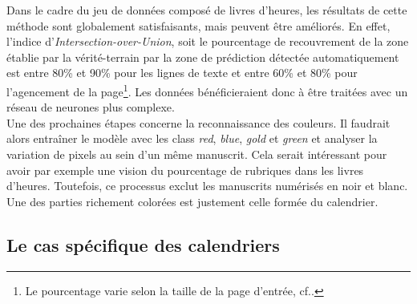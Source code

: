 \documentclass[a4paper,12pt,twoside]{book}
\begin{document}
    Dans le cadre du jeu de données composé de livres d'heures, les résultats de cette méthode sont globalement satisfaisants, mais peuvent être améliorés. En effet, l'indice d'\textit{Intersection-over-Union}, soit le pourcentage de recouvrement de la zone établie par la vérité-terrain par la zone de prédiction détectée automatiquement est entre 80\% et 90\% pour les lignes de texte et entre 60\% et 80\% pour l'agencement de la page\footnote{Le pourcentage varie selon la taille de la page d'entrée, cf.\cite[p. 10]{annotated_dataset_book_hours}.}. Les données bénéficieraient donc à être traitées avec un réseau de neurones plus complexe. \\
    
    Une des prochaines étapes concerne la reconnaissance des couleurs. Il faudrait alors entraîner le modèle avec les class \og \textit{red}\fg{}, \og \textit{blue}\fg{}, \og \textit{gold}\fg{} et \og \textit{green}\fg{} et analyser la variation de pixels au sein d’un même manuscrit. Cela serait intéressant pour avoir par exemple une vision du pourcentage de rubriques dans les livres d'heures. Toutefois, ce processus exclut les manuscrits numérisés en noir et blanc. \\
    
    Une des parties richement colorées est justement celle formée du calendrier.
    
    
    \subsection{Le cas spécifique des calendriers}
    
\end{document}
